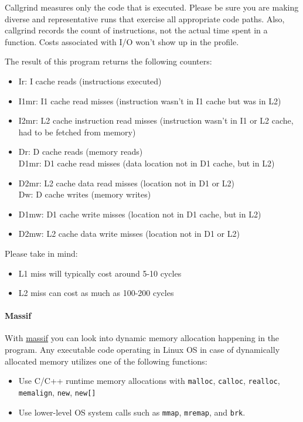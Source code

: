 \documentclass[
]{article}
\begin{document}
Callgrind measures only the code that is executed. Please be sure you
are making diverse and representative runs that exercise all appropriate
code paths. Also, callgrind records the count of instructions, not the
actual time spent in a function. Costs associated with I/O won't show up
in the profile.

The result of this program returns the following counters:

\begin{itemize}
\item
  Ir: I cache reads (instructions executed)
\item
  I1mr: I1 cache read misses (instruction wasn't in I1 cache but was in
  L2)
\item
  I2mr: L2 cache instruction read misses (instruction wasn't in I1 or L2
  cache, had to be fetched from memory)
\item
  Dr: D cache reads (memory reads)\\
  D1mr: D1 cache read misses (data location not in D1 cache, but in L2)
\item
  D2mr: L2 cache data read misses (location not in D1 or L2)\\
  Dw: D cache writes (memory writes)
\item
  D1mw: D1 cache write misses (location not in D1 cache, but in L2)
\item
  D2mw: L2 cache data write misses (location not in D1 or L2)
\end{itemize}

Please take in mind:

\begin{itemize}
\item
  L1 miss will typically cost around 5-10 cycles
\item
  L2 miss can cost as much as 100-200 cycles
\end{itemize}

\hypertarget{massif}{%
\paragraph{Massif}\label{massif}}

With \href{https://valgrind.org/docs/manual/ms-manual.html}{massif} you
can look into dynamic memory allocation happening in the program. Any
executable code operating in Linux OS in case of dynamically allocated
memory utilizes one of the following functions:

\begin{itemize}
\item
  Use C/C++ runtime memory allocations with \texttt{malloc},
  \texttt{calloc}, \texttt{realloc}, \texttt{memalign}, \texttt{new},
  \texttt{new{[}{]}}
\item
  Use lower-level OS system calls such as \texttt{mmap},
  \texttt{mremap}, and \texttt{brk}.
\end{itemize}
\end{document}
